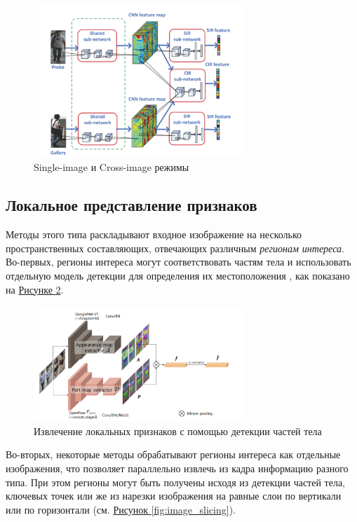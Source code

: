  \begin{figure}[ht]
     \centering
     \includegraphics[width=0.7\textwidth]{images/closed_world/single_cross_image.png}
     \caption{Single-image и Cross-image режимы \cite{wang2016joint}}
     \label{fig:cross_image}
 \end{figure}

 \subsection{Локальное представление признаков}

 Методы этого типа раскладывают входное изображение на несколько пространственных составляющих, отвечающих различным \textit{регионам интереса}. Во-первых, регионы интереса могут соответствовать частям тела и использовать отдельную модель детекции для определения их местоположения \cite{suh2018part}, как показано на \hyperref[fig:body_part]{Рисунке \ref*{fig:body_part}}.

 \begin{figure}[ht]
     \centering
     \includegraphics[width=0.7\textwidth]{images/closed_world/body_part_detection.png}
     \caption{Извлечение локальных признаков с помощью детекции частей тела \cite{suh2018part}}
     \label{fig:body_part}
 \end{figure}

 Во-вторых, некоторые методы \cite{su2018beyond} обрабатывают регионы интереса как отдельные изображения, что позволяет параллельно извлечь из кадра информацию разного типа. При этом регионы могут быть получены исходя из детекции частей тела, ключевых точек или же из нарезки изображения на равные слои по вертикали или по горизонтали (см. \hyperref[fig:image_slicing]{Рисунок \ref*{fig:image_slicing}}).

